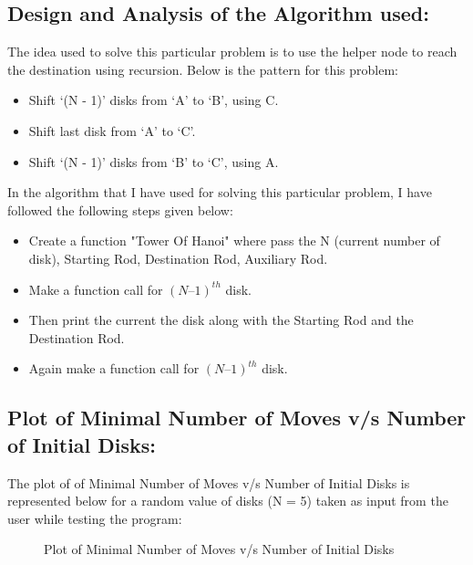 \documentclass[12pt,a4paper]{article}
\begin{document}
\subsection{Design and Analysis of the Algorithm used:}
The idea used to solve this particular problem is to use the helper node to reach the destination using recursion. Below is the pattern for this problem:
\begin{itemize}
\item Shift ‘(N - 1)’ disks from ‘A’ to ‘B’, using C.
\item Shift last disk from ‘A’ to ‘C’.
\item Shift ‘(N - 1)’ disks from ‘B’ to ‘C’, using A.
\end{itemize}
In the algorithm that I have used for solving this particular problem, I have followed the following steps given below:
\begin{itemize}
\item Create a function "Tower Of Hanoi" where pass the N (current number of disk), Starting Rod, Destination Rod, Auxiliary Rod.
\item Make a function call for $(N – 1)^{th}$ disk.
\item Then print the current the disk along with the Starting Rod and the Destination Rod.
\item Again make a function call for $(N – 1)^{th}$ disk.
\end{itemize}
\subsection{Plot of Minimal Number of Moves v/s Number of Initial Disks:}
The plot of of Minimal Number of Moves v/s Number of Initial Disks is represented below for a random value of disks (N = 5) taken as input from the user while testing the program:
\begin{figure}[!h]
	\begin{center}
	\end{center}
	\caption{Plot of Minimal Number of Moves v/s Number of Initial Disks}
\end{figure}
\end{document}
